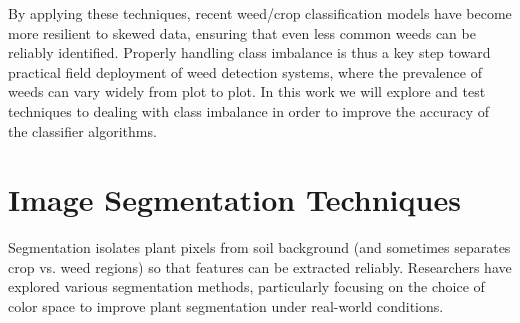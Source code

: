 \documentclass[letterpaper]{report}
\begin{document}
%
%
By applying these techniques, recent weed/crop classification models have become more resilient to skewed data, ensuring that even less common weeds can be reliably identified. Properly handling class imbalance is thus a key step toward practical field deployment of weed detection systems, where the prevalence of weeds can vary widely from plot to plot. In this work we will explore and test
techniques to dealing with class imbalance in order to improve the accuracy of the classifier algorithms.

\section{Image Segmentation Techniques}  
Segmentation isolates plant pixels from soil background (and sometimes separates crop vs. weed regions) so that features can be extracted reliably. Researchers have explored various segmentation methods, particularly focusing on the choice of color space to improve plant segmentation under real-world conditions.
%
\end{document}
